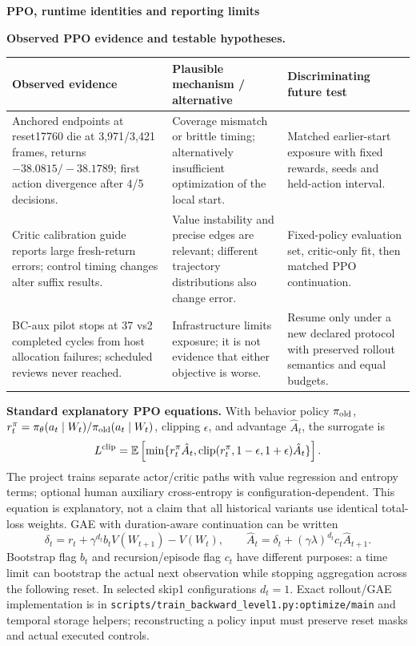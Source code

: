 \documentclass[11pt,a4paper]{article}
\newcommand{\topic}[2]{\vspace*{-4mm}{\small\color{teal}\textbf{#1}}\par{\LARGE\bfseries #2}\par\vspace{3mm}}
\newcommand{\pathref}[1]{\nolinkurl{#1}}
\begin{document}
\newpage
\topic{APPENDIX C / PROTOCOL DETAILS}{PPO, runtime identities and reporting limits}
\textbf{Observed PPO evidence and testable hypotheses.}\par
{\small
\begin{tabularx}{\linewidth}{@{}P{38mm}Y Y@{}}\toprule
Observed evidence & Plausible mechanism / alternative & Discriminating future test\\\midrule
Anchored endpoints at reset17760 die at 3,971/3,421 frames, returns $-38.0815/-38.1789$; first action divergence after 4/5 decisions. & Coverage mismatch or brittle timing; alternatively insufficient optimization of the local start. & Matched earlier-start exposure with fixed rewards, seeds and held-action interval.\\
Critic calibration guide reports large fresh-return errors; control timing changes alter suffix results. & Value instability and precise edges are relevant; different trajectory distributions also change error. & Fixed-policy evaluation set, critic-only fit, then matched PPO continuation.\\
BC-aux pilot stops at 37 vs2 completed cycles from host allocation failures; scheduled reviews never reached. & Infrastructure limits exposure; it is not evidence that either objective is worse. & Resume only under a new declared protocol with preserved rollout semantics and equal budgets.\\\bottomrule
\end{tabularx}}
\medskip
\textbf{Standard explanatory PPO equations.} With behavior policy $\pi_{\rm old}$, $r_t^\pi=\pi_\theta(a_t\mid W_t)/\pi_{\rm old}(a_t\mid W_t)$, clipping $\epsilon$, and advantage $\hat A_t$, the surrogate is \cite{ppo}
\begin{equation}
 L^{\rm clip}=\mathbb E\left[\min\{r_t^\pi\hat A_t,\operatorname{clip}(r_t^\pi,1-\epsilon,1+\epsilon)\hat A_t\}\right].
\end{equation}
The project trains separate actor/critic paths with value regression and entropy terms; optional human auxiliary cross-entropy is configuration-dependent. This equation is explanatory, not a claim that all historical variants use identical total-loss weights. GAE with duration-aware continuation can be written
\begin{equation}
 \delta_t=r_t+\gamma^{d_t}b_tV(W_{t+1})-V(W_t),\qquad
 \hat A_t=\delta_t+(\gamma\lambda)^{d_t}c_t\hat A_{t+1}.
\end{equation}
Bootstrap flag $b_t$ and recursion/episode flag $c_t$ have different purposes: a time limit can bootstrap the actual next observation while stopping aggregation across the following reset. In selected skip1 configurations $d_t=1$. Exact rollout/GAE implementation is in \pathref{scripts/train_backward_level1.py:optimize/main} and temporal storage helpers; reconstructing a policy input must preserve reset masks and actual executed controls.
\end{document}
